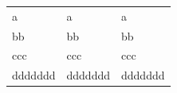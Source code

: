 \documentclass{stex}
\begin{document}
	\begin{tabular}{lll}
		a & a & a \\
		bb & bb & bb \\
		ccc & ccc & ccc \\
		ddddddd & ddddddd & ddddddd
	\end{tabular}
\end{document}
